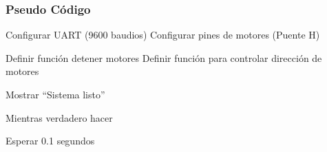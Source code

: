 \subsubsection{Pseudo Código}

\begin{algorithm}[H]
\SetAlgoLined
\caption{Control de motores por UART (Bluetooth)}

Configurar UART (9600 baudios)\;
Configurar pines de motores (Puente H)\;

Definir función detener motores\;
Definir función para controlar dirección de motores\;

Mostrar ``Sistema listo''\;

Mientras verdadero hacer\;
\Indp

    Esperar 0.1 segundos\;
\Indm

\end{algorithm}

\newpage
